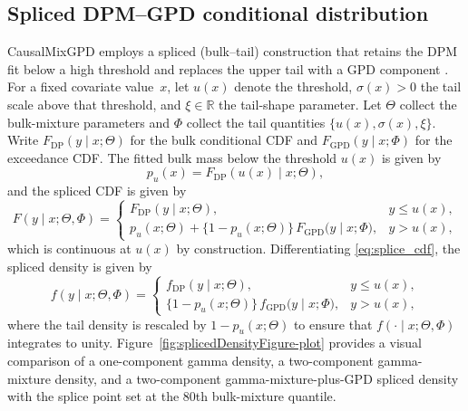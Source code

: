\documentclass[11pt]{article}\usepackage[]{graphicx}\usepackage[]{xcolor}
\newcommand{\pkg}[1]{\textsf{#1}}
\begin{document}
\subsection{Spliced DPM--GPD conditional distribution}
\label{subsec:splice}

\pkg{CausalMixGPD} employs a spliced (bulk--tail) construction that
retains the DPM fit below a high threshold and replaces the upper tail
with a GPD component
\citep{Frigessi2002,Behrens2004,Coles2001}.  For a fixed covariate
value~$x$, let $u(x)$ denote the threshold, $\sigma(x)>0$ the tail
scale above that threshold, and $\xi\in\mathbb{R}$ the tail-shape
parameter.  Let $\Theta$ collect the bulk-mixture parameters and
$\Phi$ collect the tail quantities $\{u(x),\sigma(x),\xi\}$.  Write
$F_{\mathrm{DP}}(y\mid x;\Theta)$ for the bulk conditional CDF and
$F_{\mathrm{GPD}}(y\mid x;\Phi)$ for the exceedance CDF.  The fitted bulk mass below the threshold $u(x)$ is given by
\begin{equation*}
p_u(x)=F_{\mathrm{DP}}(u(x)\mid x;\Theta),
\end{equation*}
and the spliced CDF is given by
\begin{equation}
F(y\mid x;\Theta,\Phi)=
\begin{cases}
F_{\mathrm{DP}}(y\mid x;\Theta), & y \le u(x),\\[6pt]
p_u(x;\Theta)
+
\bigl\{1-p_u(x;\Theta)\bigr\}\,
F_{\mathrm{GPD}}\!\bigl(y\mid x;\Phi\bigr),
& y>u(x),
\end{cases}
\label{eq:splice_cdf}
\end{equation}
which is continuous at $u(x)$ by construction.  Differentiating
\eqref{eq:splice_cdf}, the spliced density is given by
\begin{equation}
f(y\mid x;\Theta,\Phi)=
\begin{cases}
f_{\mathrm{DP}}(y\mid x;\Theta), & y \le u(x),\\[8pt]
\bigl\{1-p_u(x;\Theta)\bigr\}\,
f_{\mathrm{GPD}}\!\bigl(y\mid x;\Phi\bigr),
& y>u(x),
\end{cases}
\label{eq:splice_pdf}
\end{equation}
where the tail density is rescaled by $1-p_u(x;\Theta)$ to ensure that
$f(\cdot\mid x;\Theta,\Phi)$ integrates to unity.
Figure~\ref{fig:splicedDensityFigure-plot} provides a visual
comparison of a one-component gamma density, a two-component
gamma-mixture density, and a two-component gamma-mixture-plus-GPD
spliced density with the splice point set at the 80th bulk-mixture
quantile.
\end{document}
